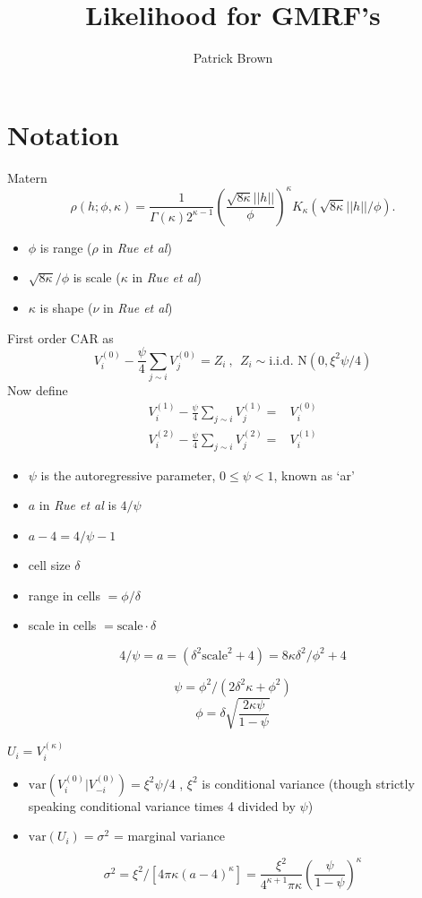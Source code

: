 \documentclass[12pt]{article}
\title{Likelihood for GMRF's}
\author{Patrick Brown}
\begin{document}
\section{Notation}

Matern
\[
\rho(h; \phi, \kappa) = \frac{1}{\Gamma(\kappa)2^{\kappa-1}}\left(\frac{\sqrt{8\kappa}||h||}{\phi}\right)^\kappa
K_\kappa\left(\sqrt{8\kappa}||h||/\phi\right).
\]

\begin{itemize}
  \item $\phi$ is range ($\rho$ in \textit{Rue et al})
  \item $\sqrt{8\kappa}/\phi$ is scale ($\kappa$ in \textit{Rue et al})
  \item $\kappa$ is shape ($\nu$ in \textit{Rue et al})
\end{itemize}


First order CAR as
\[
V^{(0)}_i - \frac{\psi}{4}\sum_{j\sim i} V^{(0)}_j =  Z_i \ , \ \
Z_i \sim  \text{i.i.d.\ N}(0, \xi^2\psi/4)
\]
Now define
\begin{align*}
V^{(1)}_i - \frac{\psi}{4}\sum_{j\sim i} V^{(1)}_j = & V^{(0)}_i\\
V^{(2)}_i -\frac{\psi}{4}\sum_{j\sim i} V^{(2)}_j = & V^{(1)}_i
\end{align*}


\begin{itemize}
  \item $\psi$ is the autoregressive parameter, $0\leq\psi < 1$, known as `ar'
  \item $a$ in \textit{Rue et al} is $4/\psi$
  \item $a-4 = 4/\psi-1$
  \item cell size $\delta$
    \item range in cells $ = \phi/ \delta$
  \item scale in cells $=\text{scale}\cdot\delta$
\end{itemize}

\[
	4/\psi = a = (\delta^2\text{scale}^2 + 4) = 8 \kappa \delta^2 / \phi^2 + 4
\]

\[
\psi = \phi^2/(2 \delta^2 \kappa + \phi^2)
\]
\[
\phi =  \delta \sqrt{\frac{2\kappa\psi}{1-\psi}}
\]


$U_i = V^{(\kappa)}_i$


\begin{itemize}
  \item $\text{var}(V^{(0)}_i | V^{(0)}_{-i}) = \xi^2\psi/4$ , $\xi^2$ is conditional
  variance (though strictly speaking conditional variance times 4 divided by
  $\psi$)
  \item $\text{var}(U_i) = \sigma^2$ = marginal variance
\end{itemize}
\[
\sigma^2 =  \xi^2/[4\pi\kappa(a-4)^\kappa] =
\frac{\xi^2}{ 4^{\kappa+1}\pi\kappa} \left(\frac{\psi}{1-\psi}\right)^\kappa
\]
\end{document}
